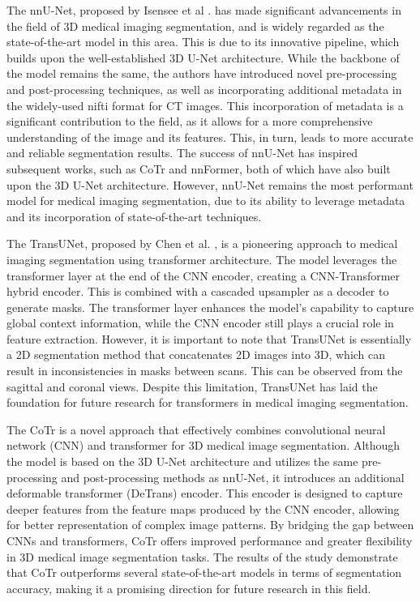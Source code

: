 The nnU-Net, proposed by Isensee et al \cite{14}. has made significant advancements in the field of 3D medical imaging segmentation, and is widely regarded as the state-of-the-art model in this area. This is due to its innovative pipeline, which builds upon the well-established 3D U-Net architecture. While the backbone of the model remains the same, the authors have introduced novel pre-processing and post-processing techniques, as well as incorporating additional metadata in the widely-used nifti format for CT images. This incorporation of metadata is a significant contribution to the field, as it allows for a more comprehensive understanding of the image and its features. This, in turn, leads to more accurate and reliable segmentation results. The success of nnU-Net has inspired subsequent works, such as CoTr and nnFormer, both of which have also built upon the 3D U-Net architecture. However, nnU-Net remains the most performant model for medical imaging segmentation, due to its ability to leverage metadata and its incorporation of state-of-the-art techniques.


The TransUNet, proposed by Chen et al. \cite{21}, is a pioneering approach to medical imaging segmentation using transformer architecture. The model leverages the transformer layer at the end of the CNN encoder, creating a CNN-Transformer hybrid encoder. This is combined with a cascaded upsampler as a decoder to generate masks. The transformer layer enhances the model's capability to capture global context information, while the CNN encoder still plays a crucial role in feature extraction. However, it is important to note that TransUNet is essentially a 2D segmentation method that concatenates 2D images into 3D, which can result in inconsistencies in masks between scans. This can be observed from the sagittal and coronal views. Despite this limitation, TransUNet has laid the foundation for future research for transformers in medical imaging segmentation.



The CoTr is a novel approach that effectively combines convolutional neural network (CNN) and transformer for 3D medical image segmentation. Although the model is based on the 3D U-Net architecture and utilizes the same pre-processing and post-processing methods as nnU-Net, it introduces an additional deformable transformer (DeTrans) encoder. This encoder is designed to capture deeper features from the feature maps produced by the CNN encoder, allowing for better representation of complex image patterns. By bridging the gap between CNNs and transformers, CoTr offers improved performance and greater flexibility in 3D medical image segmentation tasks. The results of the study demonstrate that CoTr outperforms several state-of-the-art models in terms of segmentation accuracy, making it a promising direction for future research in this field.

